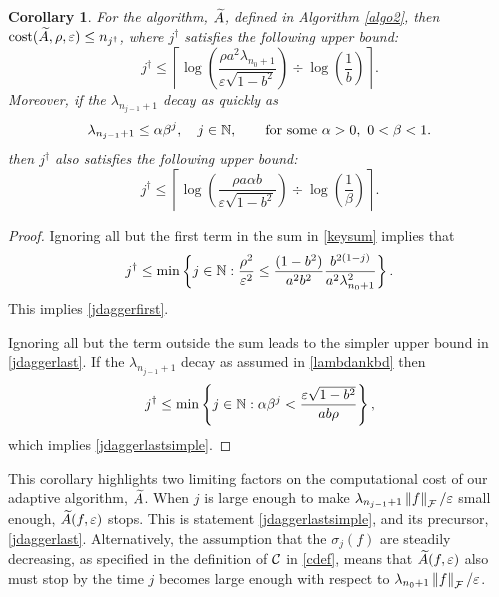 \documentclass[final]{elsarticle}
\newtheorem{cor}[theorem]{Corollary}
\theoremstyle{definition}
\theoremstyle{remark}
\begin{document}
\begin{cor} For the algorithm, $\tA$, defined in Algorithm \ref{algo2}, then $\cost(\tA,\rho,\varepsilon) \le n_{j^\dagger}$, where $j^\dagger$ satisfies the following upper bound:
\begin{equation} \label{jdaggerfirst}
j^\dagger \le \left \lceil \log\left(\frac{\rho a^2\lambda_{n_{0}+1} }{\varepsilon \sqrt{1 - b^2}}\right) \div \log\left(\frac{1}{b}\right) \right \rceil.
\end{equation}
Moreover, if the $\lambda_{n_{j-1}+1}$ decay as quickly as
\begin{equation}
\label{lambdankbd}
\lambda_{n_{j-1}+1} \le \alpha \beta^j,  \quad j \in \naturals,  \qquad \text{for some } \alpha > 0, \ 0 < \beta < 1.
\end{equation}
then $j^\dagger$ also satisfies the following upper bound:
\begin{equation}
\label{jdaggerlastsimple}
j^\dagger \le
\left \lceil \log\left(\frac{\rho a\alpha b }{\varepsilon \sqrt{1 - b^2}}\right) \div \log\left(\frac{1}{\beta}\right) \right \rceil.
\end{equation}
\end{cor}

\begin{proof}
Ignoring all but the first term in the sum in \eqref{keysum} implies that 
\begin{equation} \label{jsumupperbd}
j^\dagger \le \min \left \{j \in \naturals : \frac{\rho^2}{\varepsilon^2} \le \frac{(1 - b^2)}{a^2b^2} \frac{b^{2(1-j)}}{a^2\lambda_{n_{0}+1}^2}    \right\}.
\end{equation}
This implies \eqref{jdaggerfirst}.

Ignoring all but the term outside the sum leads to the simpler upper bound in \eqref{jdaggerlast}.  If the $\lambda_{n_{j-1}+1}$ decay as assumed in \eqref{lambdankbd} then
\[
j^\dagger \le \min \left \{j \in \naturals :  \alpha \beta^j < \frac{\varepsilon\sqrt{1 - b^2}}{ab \rho} \right\},
\]
which implies \eqref{jdaggerlastsimple}.
\end{proof}

This corollary highlights two limiting factors on the computational cost of our adaptive algorithm, $\tA$. When $j$ is large enough to make $\lambda_{n_{j-1}+1}\norm[\cf]{f}/\varepsilon$ small enough, $\tA(f,\varepsilon)$ stops.  This is statement \eqref{jdaggerlastsimple}, and its precursor, \eqref{jdaggerlast}.  Alternatively, the assumption that the $\sigma_j(f)$ are steadily decreasing, as specified in the definition of $\cc$ in \eqref{cdef}, means that $\tA(f,\varepsilon)$ also must stop by the time $j$ becomes large enough with respect to $\lambda_{n_0+1}\norm[\cf]{f}/\varepsilon$.
\end{document}

